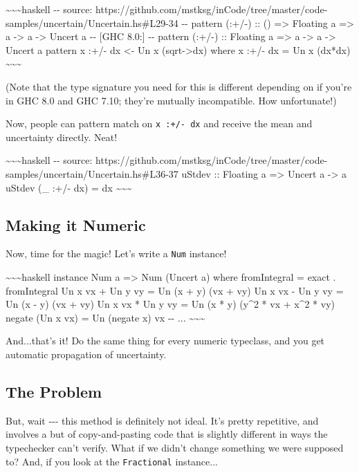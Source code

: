 \documentclass[]{article}
\begin{document}
\textasciitilde{}\textasciitilde{}\textasciitilde{}haskell -\/- source:
https://github.com/mstksg/inCode/tree/master/code-samples/uncertain/Uncertain.hs\#L29-34
-\/- pattern (:+/-) :: () =\textgreater{} Floating a =\textgreater{} a
-\textgreater{} a -\textgreater{} Uncert a -\/- {[}GHC 8.0:{]} -\/- pattern
(:+/-) :: Floating a =\textgreater{} a -\textgreater{} a -\textgreater{} Uncert
a pattern x :+/- dx \textless{}- Un x (sqrt-\textgreater{}dx) where x :+/- dx =
Un x (dx*dx) \textasciitilde{}\textasciitilde{}\textasciitilde{}

(Note that the type signature you need for this is different depending on if
you're in GHC 8.0 and GHC 7.10; they're mutually incompatible. How unfortunate!)

Now, people can pattern match on \texttt{x\ :+/-\ dx} and receive the mean and
uncertainty directly. Neat!

\textasciitilde{}\textasciitilde{}\textasciitilde{}haskell -\/- source:
https://github.com/mstksg/inCode/tree/master/code-samples/uncertain/Uncertain.hs\#L36-37
uStdev :: Floating a =\textgreater{} Uncert a -\textgreater{} a uStdev (\_ :+/-
dx) = dx \textasciitilde{}\textasciitilde{}\textasciitilde{}

\subsection{Making it Numeric}

Now, time for the magic! Let's write a \texttt{Num} instance!

\textasciitilde{}\textasciitilde{}\textasciitilde{}haskell instance Num a
=\textgreater{} Num (Uncert a) where fromIntegral = exact . fromIntegral Un x vx
+ Un y vy = Un (x + y) (vx + vy) Un x vx - Un y vy = Un (x - y) (vx + vy) Un x
vx * Un y vy = Un (x * y) (y\^{}2 * vx + x\^{}2 * vy) negate (Un x vx) = Un
(negate x) vx -\/- ... \textasciitilde{}\textasciitilde{}\textasciitilde{}

And...that's it! Do the same thing for every numeric typeclass, and you get
automatic propagation of uncertainty.

\subsection{The Problem}

But, wait -\/-\/- this method is definitely not ideal. It's pretty repetitive,
and involves a but of copy-and-pasting code that is slightly different in ways
the typechecker can't verify. What if we didn't change something we were
supposed to? And, if you look at the \texttt{Fractional} instance...
\end{document}
